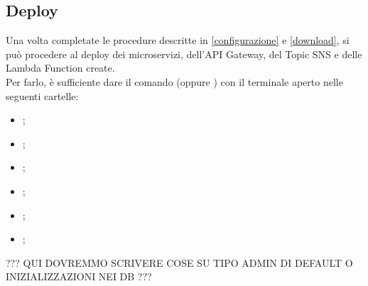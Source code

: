 \subsection{Deploy}
Una volta completate le procedure descritte in \ref{configurazione} e \ref{download}, si può procedere al deploy dei microservizi, dell'API Gateway, del Topic SNS e delle Lambda Function create.\\
Per farlo, è sufficiente dare il comando  (oppure ) con il terminale aperto nelle seguenti cartelle:
\begin{itemize}
	\item {};
	\item {};
	\item {};
	\item {};
	\item {};
	\item {};
\end{itemize}

??? QUI DOVREMMO SCRIVERE COSE SU TIPO ADMIN DI DEFAULT O INIZIALIZZAZIONI NEI DB ???